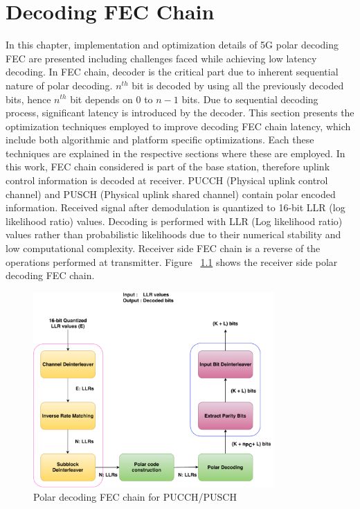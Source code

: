 \chapter{Decoding FEC Chain} \label{chap:DecodingChain}
In this chapter, implementation and optimization details of 5G polar decoding FEC are presented including challenges faced while achieving low latency decoding. In FEC chain, decoder is the critical part due to inherent sequential nature of polar decoding. $n^{th}$ bit is decoded by using all the previously decoded bits, hence $n^{th}$ bit depends on $0$ to $n-1$ bits. Due to sequential decoding process, significant latency is introduced by the decoder. This section presents the optimization techniques employed to improve decoding FEC chain latency, which include both algorithmic and platform specific optimizations. Each these techniques are explained in the respective sections where these are employed. In this work, FEC chain considered is part of the base station, therefore uplink control information is decoded at receiver. PUCCH (Physical uplink control channel) and PUSCH (Physical uplink shared channel) contain polar encoded information. Received signal after demodulation is quantized to 16-bit LLR (log likelihood ratio) values. Decoding is performed with LLR (Log likelihood ratio) values rather than probabilistic likelihoods due to their numerical stability and low computational complexity. Receiver side FEC chain is a reverse of the operations performed at transmitter. Figure ~\ref{fig:5grx_fec_chain} shows the receiver side polar decoding FEC chain.

\begin{figure}[]
	\centering
	\includegraphics[width=0.82\textwidth]{./figures/receiverFECChain.pdf}
	\caption{Polar decoding FEC chain for PUCCH/PUSCH}
	\label{fig:5grx_fec_chain}
\end{figure}

